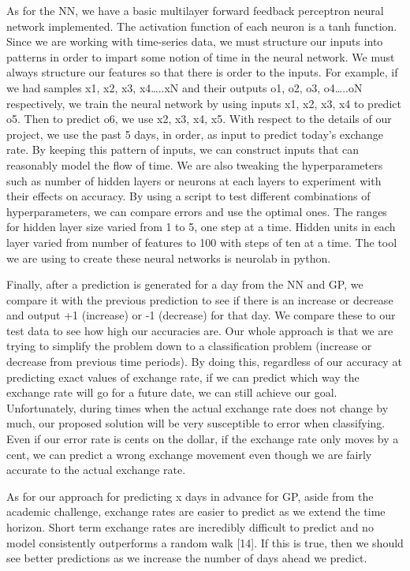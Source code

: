 \documentclass[twoside]{article}
\begin{document}
As for the NN, we have a basic multilayer forward feedback perceptron neural network implemented. The activation function of each neuron is a tanh function. Since we are working with time-series data, we must structure our inputs into patterns in order to impart some notion of time in the neural network. We must always structure our features so that there is order to the inputs. For example, if we had samples x1, x2, x3, x4…..xN and their outputs o1, o2, o3, o4…..oN respectively, we train the neural network by using inputs x1, x2, x3, x4 to predict o5. Then to predict o6, we use x2, x3, x4, x5. With respect to the details of our project, we use the past 5 days, in order, as input to predict today’s exchange rate. By keeping this pattern of inputs, we can construct inputs that can reasonably model the flow of time. We are also tweaking the hyperparameters such as number of hidden layers or neurons at each layers to experiment with their effects on accuracy. By using a script to test different combinations of hyperparameters, we can compare errors and use the optimal ones. The ranges for hidden layer size varied from 1 to 5, one step at a time. Hidden units in each layer varied from number of features to 100 with steps of ten at a time. The tool we are using to create these neural networks is neurolab in python.

Finally, after a prediction is generated for a day from the NN and GP, we compare it with the previous prediction to see if there is an increase or decrease and output +1 (increase) or -1 (decrease) for that day. We compare these to our test data to see how high our accuracies are.
Our whole approach is that we are trying to simplify the problem down to a classification problem (increase or decrease from previous time periods). By doing this, regardless of our accuracy at predicting exact values of exchange rate, if we can predict which way the exchange rate will go for a future date, we can still achieve our goal. Unfortunately, during times when the actual exchange rate does not change by much, our proposed solution will be very susceptible to error when classifying. Even if our error rate is cents on the dollar, if the exchange rate only moves by a cent, we can predict a wrong exchange movement even though we are fairly accurate to the actual exchange rate.

As for our approach for predicting x days in advance for GP, aside from the academic challenge, exchange rates are easier to predict as we extend the time horizon. Short term exchange rates are incredibly difficult to predict and no model consistently outperforms a random walk [14]. If this is true, then we should see better predictions as we increase the number of days ahead we predict.
\end{document}
